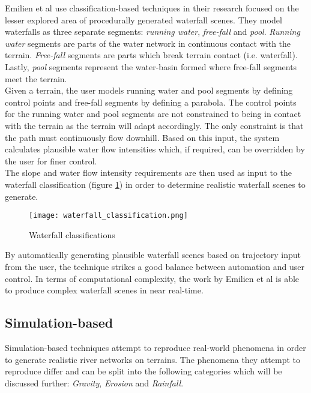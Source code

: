 Emilien et al \cite{Emilien2014} use classification-based techniques in their research focused on the lesser explored area of procedurally generated waterfall scenes. They model waterfalls as three separate segments: \textit{running water}, \textit{free-fall} and \textit{pool}. \textit{Running water} segments are parts of the water network in continuous contact with the terrain. \textit{Free-fall} segments are parts which break terrain contact (i.e. waterfall). Lastly, \textit{pool} segments represent the water-basin formed where free-fall segments meet the terrain. \\
Given a terrain, the user models running water and pool segments by defining control points and free-fall segments by defining a parabola. The control points for the running water and pool segments are not constrained to being in contact with the terrain as the terrain will adapt accordingly. The only constraint is that the path must continuously flow downhill. Based on this input, the system calculates plausible water flow intensities which, if required, can be overridden by the user for finer control.\\
The slope and water flow intensity requirements are then used as input to the waterfall classification (figure \ref{Waterfall classifications}) in order to determine realistic waterfall scenes to generate.\\

\begin{figure}[h]
  \centering
	\label{Waterfall classifications}
	\texttt{[image: waterfall\_classification.png]}
	\caption{Waterfall classifications \cite{Emilien2014}}
\end{figure}

By automatically generating plausible waterfall scenes based on trajectory input from the user, the technique strikes a good balance between automation and user control. In terms of computational complexity, the work by Emilien et al \cite{Emilien2014} is able to produce complex waterfall scenes in near real-time.

\subsection{Simulation-based}

Simulation-based techniques attempt to reproduce real-world phenomena in order to generate realistic river networks on terrains. The phenomena they attempt to reproduce differ and can be split into the following categories which will be discussed further: \textit{Gravity}, \textit{Erosion} and \textit{Rainfall}.

